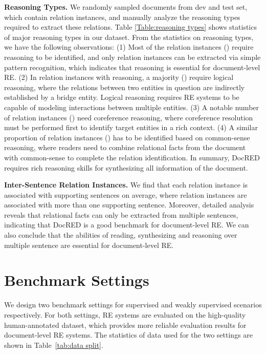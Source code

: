 \documentclass[11pt,a4paper]{article}
\begin{document}
\smallskip
\noindent
\textbf{Reasoning Types.}
We randomly sampled  documents from dev and test set, which contain  relation instances, and manually analyze the reasoning types required to extract these relations.  Table \ref{Table:reasoning types} shows statistics of major reasoning types in our dataset. From the statistics on reasoning types, we have the following observations:
(1) Most of the relation instances () require reasoning to be identified, and only  relation instances can be extracted via simple pattern recognition, which indicates that reasoning is essential for document-level RE. 
(2) In relation instances with reasoning, a majority () require logical reasoning, where the relations between two entities in question are indirectly established by a bridge entity. Logical reasoning requires RE systems to be capable of modeling interactions between multiple entities.
(3) A notable number of relation instances () need coreference reasoning, where coreference resolution must be performed first to identify target entities in a rich context. 
(4) A similar proportion of relation instances () has to be identified based on common-sense reasoning, where readers need to combine relational facts from the document with common-sense to complete the relation identification. In summary, DocRED requires rich reasoning skills for synthesizing all information of the document.




\smallskip
\noindent
\textbf{Inter-Sentence Relation Instances.} We find that each relation instance is associated with  supporting sentences on average, where  relation instances are associated with more than one supporting sentence. 
Moreover, detailed analysis reveals that  relational facts can only be extracted from multiple sentences, indicating that DocRED is a good benchmark for document-level RE. We can also conclude that the abilities of reading, synthesizing and reasoning over multiple sentence are essential for document-level RE.







\section{Benchmark Settings}
\label{Sec:Benchmark}
We design two benchmark settings for supervised and weakly supervised scenarios respectively. For both settings, RE systems are evaluated on the high-quality human-annotated dataset, which provides more reliable evaluation results for document-level RE systems. The statistics of data used for the two settings are shown in Table~\ref{tab:data split}.
\end{document}
